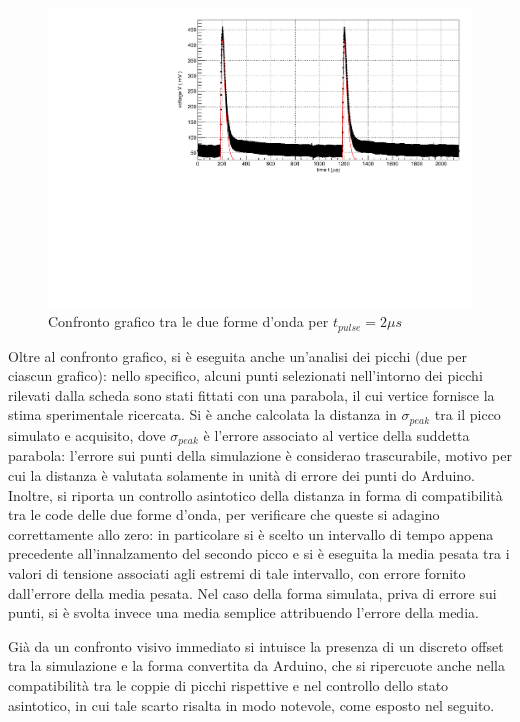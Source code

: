 \documentclass{article}
\begin{document}
\begin{center}
\begin{figure}[H]
\centering
\includegraphics[scale=0.4, angle=0]{arduino2.pdf}
\caption{Confronto grafico tra le due forme d'onda per $t_{pulse}=2 \mu s$}
\label{fig:arduino2}
\end{figure}
\end{center}


Oltre al confronto grafico, si è eseguita anche un'analisi dei picchi (due per ciascun grafico): nello specifico, alcuni punti selezionati nell'intorno dei picchi 
rilevati dalla scheda sono stati fittati con una parabola, il cui vertice fornisce la stima sperimentale ricercata. Si è anche calcolata la distanza in 
$\sigma_{peak}$ tra il picco simulato e acquisito, dove $\sigma_{peak}$ è l'errore associato al vertice della suddetta parabola: l'errore sui punti della simulazione
è considerao trascurabile, motivo per cui la distanza è valutata solamente in unità di errore dei punti do Arduino.
Inoltre, si riporta un controllo asintotico della distanza in forma di compatibilità tra le code delle due forme d'onda, per verificare che queste 
si adagino correttamente allo zero: in particolare si è scelto un intervallo di tempo appena precedente all'innalzamento del secondo picco e si è eseguita la media
pesata tra i valori di tensione associati agli estremi di tale intervallo, con errore fornito dall'errore della media pesata. Nel caso della forma simulata, priva di 
errore sui punti, si è svolta invece una media semplice attribuendo l'errore della media.

Già da un confronto visivo immediato si intuisce la presenza di un discreto offset tra la simulazione e la forma convertita da Arduino, che si ripercuote
anche nella compatibilità tra le coppie di picchi rispettive e nel controllo dello stato asintotico, in cui tale scarto risalta in modo notevole, come esposto
nel seguito.
\end{document}
